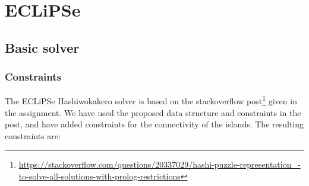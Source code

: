 \documentclass{report}
\begin{document}
\section{ECLiPSe}

\subsection{Basic solver}
\subsubsection{Constraints}
The ECLiPSe Hashiwokakero solver is based on the stackoverflow post\footnote{\url{https://stackoverflow.com/questions/20337029/hashi-puzzle-representation\_-to-solve-all-solutions-with-prolog-restrictions}} given in the assignment. We have used the proposed data structure and constraints in the post, and have added constraints for the connectivity of the islands. The resulting constraints are:
\end{document}
